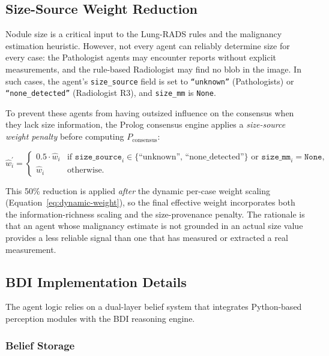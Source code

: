 \documentclass[12pt]{article}
\begin{document}
\subsection{Size-Source Weight Reduction}
\label{subsec:size-weight-reduction}

Nodule size is a critical input to the Lung-RADS rules and the malignancy estimation heuristic. However, not every agent can reliably determine size for every case: the Pathologist agents may encounter reports without explicit measurements, and the rule-based Radiologist may find no blob in the image. In such cases, the agent's \texttt{size\_source} field is set to \texttt{``unknown''} (Pathologists) or \texttt{``none\_detected''} (Radiologist R3), and \texttt{size\_mm} is \texttt{None}.

To prevent these agents from having outsized influence on the consensus when they lack size information, the Prolog consensus engine applies a \emph{size-source weight penalty} before computing $P_\text{consensus}$:

\begin{equation}
\hat{w}_i^{\prime} =
\begin{cases}
0.5 \cdot \hat{w}_i & \text{if } \texttt{size\_source}_i \in \{\text{``unknown'', ``none\_detected''}\} \text{ or } \texttt{size\_mm}_i = \texttt{None}, \\
\hat{w}_i & \text{otherwise.}
\end{cases}
\label{eq:size-penalty}
\end{equation}

This 50\% reduction is applied \emph{after} the dynamic per-case weight scaling (Equation~\ref{eq:dynamic-weight}), so the final effective weight incorporates both the information-richness scaling and the size-provenance penalty. The rationale is that an agent whose malignancy estimate is not grounded in an actual size value provides a less reliable signal than one that has measured or extracted a real measurement.

\subsection{BDI Implementation Details}
\label{subsec:bdi-details}

The agent logic relies on a dual-layer belief system that integrates Python-based perception modules with the BDI reasoning engine.

\subsubsection{Belief Storage}
\end{document}
